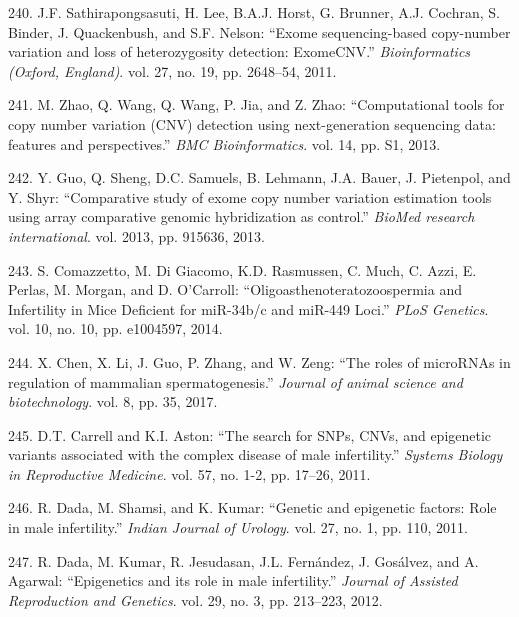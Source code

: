 \documentclass[12pt,a4paper,twoside]{ugathesis}
\theoremstyle{definition}
\theoremstyle{definition}
\theoremstyle{definition}
\theoremstyle{remark}
\begin{document}
\hypertarget{ref-Sathirapongsasuti2011}{}
240. J.F. Sathirapongsasuti, H. Lee, B.A.J. Horst, G. Brunner, A.J.
Cochran, S. Binder, J. Quackenbush, and S.F. Nelson: ``Exome
sequencing-based copy-number variation and loss of heterozygosity
detection: ExomeCNV.'' \emph{Bioinformatics (Oxford, England)}. vol. 27,
no. 19, pp. 2648--54, 2011.

\hypertarget{ref-Zhao2013}{}
241. M. Zhao, Q. Wang, Q. Wang, P. Jia, and Z. Zhao: ``Computational
tools for copy number variation (CNV) detection using next-generation
sequencing data: features and perspectives.'' \emph{BMC Bioinformatics}.
vol. 14, pp. S1, 2013.

\hypertarget{ref-Guo2013}{}
242. Y. Guo, Q. Sheng, D.C. Samuels, B. Lehmann, J.A. Bauer, J.
Pietenpol, and Y. Shyr: ``Comparative study of exome copy number
variation estimation tools using array comparative genomic hybridization
as control.'' \emph{BioMed research international}. vol. 2013, pp.
915636, 2013.

\hypertarget{ref-Comazzetto2014}{}
243. S. Comazzetto, M. Di Giacomo, K.D. Rasmussen, C. Much, C. Azzi, E.
Perlas, M. Morgan, and D. O'Carroll: ``Oligoasthenoteratozoospermia and
Infertility in Mice Deficient for miR-34b/c and miR-449 Loci.''
\emph{PLoS Genetics}. vol. 10, no. 10, pp. e1004597, 2014.

\hypertarget{ref-Chen2017}{}
244. X. Chen, X. Li, J. Guo, P. Zhang, and W. Zeng: ``The roles of
microRNAs in regulation of mammalian spermatogenesis.'' \emph{Journal of
animal science and biotechnology}. vol. 8, pp. 35, 2017.

\hypertarget{ref-Carrell2011}{}
245. D.T. Carrell and K.I. Aston: ``The search for SNPs, CNVs, and
epigenetic variants associated with the complex disease of male
infertility.'' \emph{Systems Biology in Reproductive Medicine}. vol. 57,
no. 1-2, pp. 17--26, 2011.

\hypertarget{ref-Dada2011}{}
246. R. Dada, M. Shamsi, and K. Kumar: ``Genetic and epigenetic factors:
Role in male infertility.'' \emph{Indian Journal of Urology}. vol. 27,
no. 1, pp. 110, 2011.

\hypertarget{ref-Dada2012}{}
247. R. Dada, M. Kumar, R. Jesudasan, J.L. Fernández, J. Gosálvez, and
A. Agarwal: ``Epigenetics and its role in male infertility.''
\emph{Journal of Assisted Reproduction and Genetics}. vol. 29, no. 3,
pp. 213--223, 2012.


\end{document}
